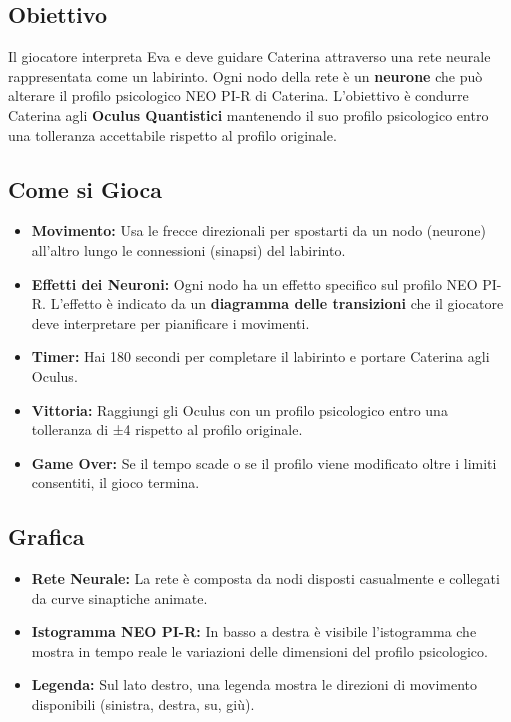 \documentclass[a4paper,10pt]{article}
\begin{document}
\subsection*{Obiettivo}
Il giocatore interpreta Eva e deve guidare Caterina attraverso una rete neurale rappresentata come un labirinto. Ogni nodo della rete è un \textbf{neurone} che può alterare il profilo psicologico NEO PI-R di Caterina. L'obiettivo è condurre Caterina agli \textbf{Oculus Quantistici} mantenendo il suo profilo psicologico entro una tolleranza accettabile rispetto al profilo originale.

\subsection*{Come si Gioca}
\begin{itemize}
    \item \textbf{Movimento:} Usa le frecce direzionali per spostarti da un nodo (neurone) all'altro lungo le connessioni (sinapsi) del labirinto.
    \item \textbf{Effetti dei Neuroni:} Ogni nodo ha un effetto specifico sul profilo NEO PI-R. L'effetto è indicato da un \textbf{diagramma delle transizioni} che il giocatore deve interpretare per pianificare i movimenti.
    \item \textbf{Timer:} Hai 180 secondi per completare il labirinto e portare Caterina agli Oculus.
    \item \textbf{Vittoria:} Raggiungi gli Oculus con un profilo psicologico entro una tolleranza di ±4 rispetto al profilo originale.
    \item \textbf{Game Over:} Se il tempo scade o se il profilo viene modificato oltre i limiti consentiti, il gioco termina.
\end{itemize}

\subsection*{Grafica}
\begin{itemize}
    \item \textbf{Rete Neurale:} La rete è composta da nodi disposti casualmente e collegati da curve sinaptiche animate.
    \item \textbf{Istogramma NEO PI-R:} In basso a destra è visibile l'istogramma che mostra in tempo reale le variazioni delle dimensioni del profilo psicologico.
    \item \textbf{Legenda:} Sul lato destro, una legenda mostra le direzioni di movimento disponibili (sinistra, destra, su, giù).
\end{itemize}
\end{document}
